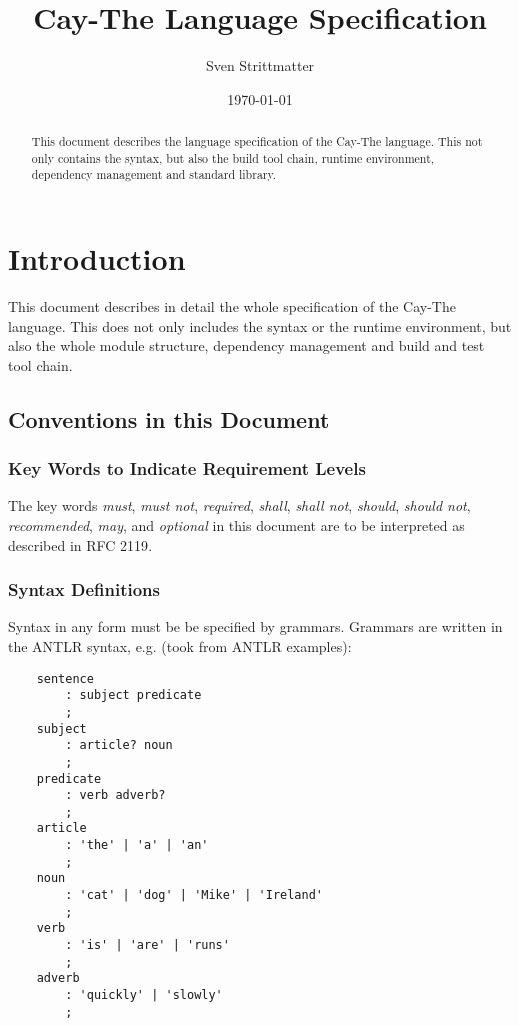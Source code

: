 \documentclass[11pt,a4paper]{report}
\title{Cay-The Language Specification}
\author{Sven Strittmatter}
\date{\today}
\begin{document}
\maketitle
\thispagestyle{empty}

\begin{abstract}
    This document describes the language specification of the Cay-The language. This not only contains the syntax, but also the build tool chain, runtime environment, dependency management and standard library.
\end{abstract}

\tableofcontents

\chapter{Introduction}

This document describes in detail the whole specification of the Cay-The language. This does not only includes the syntax or the runtime environment, but also the whole module structure, dependency management and build and test tool chain.

\section{Conventions in this Document}

\subsection{Key Words to Indicate Requirement Levels}

The key words \textit{must}, \textit{must not}, \textit{required}, \textit{shall}, \textit{shall not}, \textit{should}, \textit{should not}, \textit{recommended}, \textit{may}, and \textit{optional} in this document are to be interpreted as described in RFC 2119\cite{rfc2119}.

\subsection{Syntax Definitions}

Syntax in any form must be be specified by grammars. Grammars are written in the ANTLR syntax\cite{antlr-docu}, e.g. (took from ANTLR examples\cite{antlr-grammars}):

\begin{lstlisting}
    sentence    
        : subject predicate
        ;
    subject
        : article? noun 
        ;
    predicate
        : verb adverb?
        ;
    article
        : 'the' | 'a' | 'an' 
        ;
    noun
        : 'cat' | 'dog' | 'Mike' | 'Ireland'
        ;
    verb
        : 'is' | 'are' | 'runs' 
        ;
    adverb
        : 'quickly' | 'slowly'
        ;
\end{lstlisting}
\end{document}
